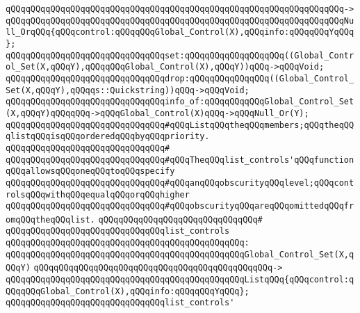 \verb|qQQqqQQqqQQqqQQqqQQqqQQqqQQqqQQqqQQqqQQqqQQqqQQqqQQqqQQqqQQqqQQqqQQq->|\newline
\verb|qQQqqQQqqQQqqQQqqQQqqQQqqQQqqQQqqQQqqQQqqQQqqQQqqQQqqQQqqQQqqQQqqQQqNull_OrqQQq{qQQqcontrol:qQQqqQQqGlobal_Control(X),qQQqinfo:qQQqqQQqYqQQq};|\newline
\newline
\verb|qQQqqQQqqQQqqQQqqQQqqQQqqQQqqQQqset:qQQqqQQqqQQqqQQqqQQq((Global_Control_Set(X,qQQqY),qQQqqQQqGlobal_Control(X),qQQqY))qQQq->qQQqVoid;|\newline
\verb|qQQqqQQqqQQqqQQqqQQqqQQqqQQqqQQqdrop:qQQqqQQqqQQqqQQq((Global_Control_Set(X,qQQqY),qQQqqs::Quickstring))qQQq->qQQqVoid;|\newline
\verb|qQQqqQQqqQQqqQQqqQQqqQQqqQQqqQQqinfo_of:qQQqqQQqqQQqGlobal_Control_Set(X,qQQqY)qQQqqQQq->qQQqGlobal_Control(X)qQQq->qQQqNull_Or(Y);|\newline
\newline
\newline
\verb|qQQqqQQqqQQqqQQqqQQqqQQqqQQqqQQq#qQQqListqQQqtheqQQqmembers;qQQqtheqQQqlistqQQqisqQQqorderedqQQqbyqQQqpriority.|\newline
\verb|qQQqqQQqqQQqqQQqqQQqqQQqqQQqqQQq#|\newline
\verb|qQQqqQQqqQQqqQQqqQQqqQQqqQQqqQQq#qQQqTheqQQqlist_controls'qQQqfunctionqQQqallowsqQQqoneqQQqtoqQQqspecify|\newline
\verb|qQQqqQQqqQQqqQQqqQQqqQQqqQQqqQQq#qQQqanqQQqobscurityqQQqlevel;qQQqcontrolsqQQqwithqQQqequalqQQqorqQQqhigher|\newline
\verb|qQQqqQQqqQQqqQQqqQQqqQQqqQQqqQQq#qQQqobscurityqQQqareqQQqomittedqQQqfromqQQqtheqQQqlist.|\newline
\verb|qQQqqQQqqQQqqQQqqQQqqQQqqQQqqQQq#|\newline
\verb|qQQqqQQqqQQqqQQqqQQqqQQqqQQqqQQqlist_controls|\newline
\verb|qQQqqQQqqQQqqQQqqQQqqQQqqQQqqQQqqQQqqQQqqQQqqQQq:|\newline
\verb|qQQqqQQqqQQqqQQqqQQqqQQqqQQqqQQqqQQqqQQqqQQqqQQqGlobal_Control_Set(X,qQQqY)|\newline
\verb|qQQqqQQqqQQqqQQqqQQqqQQqqQQqqQQqqQQqqQQqqQQqqQQq->|\newline
\verb|qQQqqQQqqQQqqQQqqQQqqQQqqQQqqQQqqQQqqQQqqQQqqQQqListqQQq{qQQqcontrol:qQQqqQQqGlobal_Control(X),qQQqinfo:qQQqqQQqYqQQq};|\newline
\newline
\verb|qQQqqQQqqQQqqQQqqQQqqQQqqQQqqQQqlist_controls'|\newline
